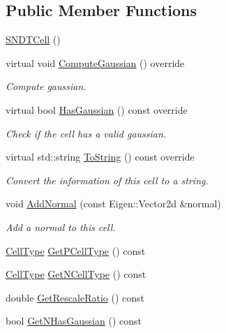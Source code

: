 \subsection*{Public Member Functions}
\begin{DoxyCompactItemize}
\item 
\hyperlink{classSNDTCell_a2431d3f2e9bf345f60169c545cea1804}{S\+N\+D\+T\+Cell} ()
\item 
virtual void \hyperlink{classSNDTCell_a86aa415947d71974d4a57920bb02fe1b}{Compute\+Gaussian} () override
\begin{DoxyCompactList}\small\item\em Compute gaussian. \end{DoxyCompactList}\item 
virtual bool \hyperlink{classSNDTCell_ababb27a2efdb0537d5bb29cec36b82f4}{Has\+Gaussian} () const override
\begin{DoxyCompactList}\small\item\em Check if the cell has a valid gaussian. \end{DoxyCompactList}\item 
virtual std\+::string \hyperlink{classSNDTCell_a396e9b04c4ce9976868b0b3f12aa1021}{To\+String} () const override
\begin{DoxyCompactList}\small\item\em Convert the information of this cell to a string. \end{DoxyCompactList}\item 
void \hyperlink{classSNDTCell_a70e60d446284c39a7f2708fc31b762c8}{Add\+Normal} (const Eigen\+::\+Vector2d \&normal)
\begin{DoxyCompactList}\small\item\em Add a normal to this cell. \end{DoxyCompactList}\item 
\hyperlink{classSNDTCell_a89f320f167cfeb7ccdbb4a578a169341}{Cell\+Type} \hyperlink{classSNDTCell_ae0f8a6a889916a9283397360b99d4a2c}{Get\+P\+Cell\+Type} () const
\item 
\hyperlink{classSNDTCell_a89f320f167cfeb7ccdbb4a578a169341}{Cell\+Type} \hyperlink{classSNDTCell_a23d1be04c3e54c8c22c9f965d1afdd59}{Get\+N\+Cell\+Type} () const
\item 
double \hyperlink{classSNDTCell_ac80a67ac140281469143fb3b25b6ed9b}{Get\+Rescale\+Ratio} () const
\item 
bool \hyperlink{classSNDTCell_ac5cc4d7ad6313adff642df9ed301cd2a}{Get\+N\+Has\+Gaussian} () const
\item 

\end{DoxyCompactItemize}
